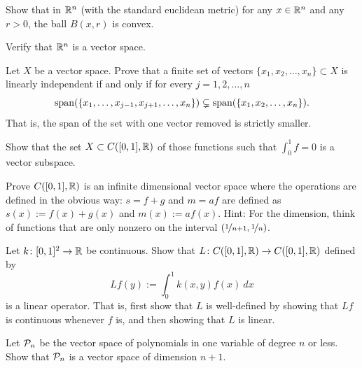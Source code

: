 \begin{exercise}
Show that in ${\mathbb{R}}^n$
(with the standard euclidean metric)
for any $x \in {\mathbb{R}}^n$ and any $r > 0$,
the ball $B(x,r)$ is
convex.
\end{exercise}


\begin{exercise}
Verify that ${\mathbb{R}}^n$ is a vector space.
\end{exercise}

\begin{exercise}
Let $X$ be a vector space.
Prove that a finite set of vectors $\{ x_1,x_2,\ldots,x_n \} \subset X$ 
is linearly independent if and only if for every $j=1,2,\ldots,n$
\begin{equation*}
\operatorname{span}( \{ x_1,\ldots,x_{j-1},x_{j+1},\ldots,x_n \}) \subsetneq
\operatorname{span}( \{ x_1,x_2,\ldots,x_n \}) .
\end{equation*}
That is, the span of the set with one vector removed is strictly smaller.
\end{exercise}

\begin{exercise}
Show that the set $X \subset C([0,1],{\mathbb{R}})$ of those functions such 
that $\int_0^1 f = 0$ is a vector subspace.
\end{exercise}

\begin{exercise}[Challenging]
Prove $C([0,1],{\mathbb{R}})$ is an infinite dimensional vector space
where the operations are defined in the obvious way:
$s=f+g$ and $m=af$ are defined as
$s(x) := f(x)+g(x)$ and
$m(x) := a f(x)$.
Hint: For the dimension, think of functions that are only nonzero
on the interval $(\nicefrac{1}{n+1},\nicefrac{1}{n})$.
\end{exercise}

\begin{exercise}
Let $k \colon [0,1]^2 \to {\mathbb{R}}$ be continuous.  Show that
$L \colon C([0,1],{\mathbb{R}}) \to C([0,1],{\mathbb{R}})$ defined by
\begin{equation*}
Lf(y) := \int_0^1 k(x,y)f(x)~dx
\end{equation*}
is a linear operator.  That is, first show that $L$ is well-defined by
showing that $Lf$ is continuous whenever $f$ is, and
then showing that $L$ is linear.
\end{exercise}

\begin{exercise}
Let ${\mathcal{P}}_n$ be the vector space of polynomials in one variable of degree $n$
or less.  Show that ${\mathcal{P}}_n$ is a vector space of dimension $n+1$.
\end{exercise}

